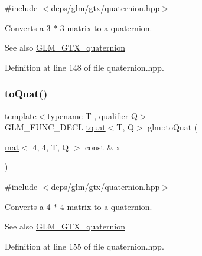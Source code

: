 {\ttfamily \#include $<$\hyperlink{gtx_2quaternion_8hpp}{deps/glm/gtx/quaternion.\+hpp}$>$}

Converts a 3 $\ast$ 3 matrix to a quaternion.

\begin{DoxySeeAlso}{See also}
\hyperlink{group__gtx__quaternion}{G\+L\+M\+\_\+\+G\+T\+X\+\_\+quaternion} 
\end{DoxySeeAlso}


Definition at line 148 of file quaternion.\+hpp.

\mbox{\label{group__gtx__quaternion_ga6c0a178ac9c7d23e1a6848045d83aa54}} 
\subsubsection{\texorpdfstring{to\+Quat()}{toQuat()}\hspace{0.1cm}{\footnotesize\ttfamily [2/2]}}
{\footnotesize\ttfamily template$<$typename T , qualifier Q$>$ \\
G\+L\+M\+\_\+\+F\+U\+N\+C\+\_\+\+D\+E\+CL \hyperlink{structglm_1_1tquat}{tquat}$<$T, Q$>$ glm\+::to\+Quat (\begin{DoxyParamCaption}\item[{\hyperlink{structglm_1_1mat}{mat}$<$ 4, 4, T, Q $>$ const \&}]{x }\end{DoxyParamCaption})}



{\ttfamily \#include $<$\hyperlink{gtx_2quaternion_8hpp}{deps/glm/gtx/quaternion.\+hpp}$>$}

Converts a 4 $\ast$ 4 matrix to a quaternion.

\begin{DoxySeeAlso}{See also}
\hyperlink{group__gtx__quaternion}{G\+L\+M\+\_\+\+G\+T\+X\+\_\+quaternion} 
\end{DoxySeeAlso}


Definition at line 155 of file quaternion.\+hpp.

